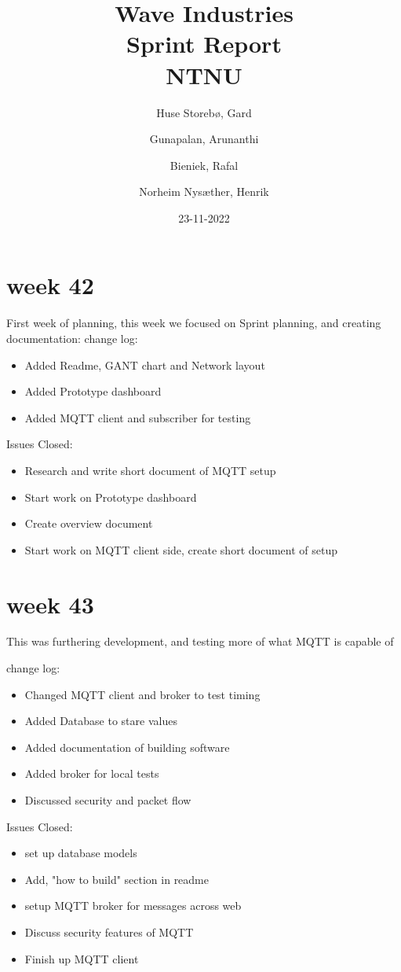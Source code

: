 \documentclass[12pt, a4]{article}
\title{Wave Industries\\
	{Sprint Report}\\
{NTNU}}
\author{
  Huse Storebø, Gard\\
  \and
  Gunapalan, Arunanthi\\
	\and
	Bieniek, Rafal\\
	\and
	Norheim Nysæther, Henrik\\
}
\date{23-11-2022}
\begin{document}
	\maketitle
	\section{week 42}
	First week of planning, this week we focused on Sprint planning, and creating documentation:
	change log:
	\begin{itemize}
		\item Added Readme, GANT chart and Network layout
		\item Added Prototype dashboard
		\item Added MQTT client and subscriber for testing
	\end{itemize}
	Issues Closed:
	\begin{itemize}
		\item Research and write short document of MQTT setup
		\item Start work on Prototype dashboard
		\item Create overview document
		\item Start work on MQTT client side, create short document of setup
	\end{itemize} 

	\clearpage
	\section{week 43}
	This was furthering development, and testing more of what MQTT is capable of
	
	change log:
	\begin{itemize}
		\item Changed MQTT client and broker to test timing
		\item Added Database to stare values
		\item Added documentation of building software
		\item Added broker for local tests
		\item Discussed security and packet flow
	\end{itemize}
	Issues Closed:
	\begin{itemize}
		\item set up database models
		\item Add, "how to build" section in readme
		\item setup MQTT broker for messages across web
		\item Discuss security features of MQTT
		\item Finish up MQTT client
	\end{itemize} 
\end{document}
